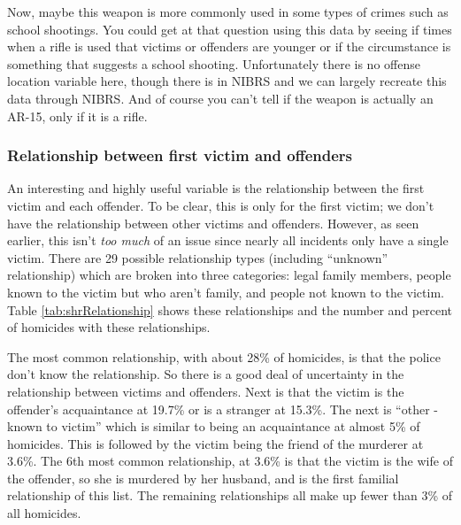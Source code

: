 \documentclass[
]{krantz}
\begin{document}
Now, maybe this weapon is more commonly used in some types
of crimes such as school shootings. You could get at that
question using this data by seeing if times when a rifle is
used that victims or offenders are younger or if the
circumstance is something that suggests a school shooting.
Unfortunately there is no offense location variable here,
though there is in NIBRS and we can largely recreate this
data through NIBRS. And of course you can't tell if the
weapon is actually an AR-15, only if it is a rifle.

\subsubsection{Relationship between first victim and
offenders}\label{relationship-between-first-victim-and-offenders}

An interesting and highly useful variable is the
relationship between the first victim and each offender. To
be clear, this is only for the first victim; we don't have
the relationship between other victims and offenders.
However, as seen earlier, this isn't \emph{too much} of an
issue since nearly all incidents only have a single victim.
There are 29 possible relationship types (including
``unknown'' relationship) which are broken into three
categories: legal family members, people known to the victim
but who aren't family, and people not known to the victim.
Table \ref{tab:shrRelationship} shows these relationships
and the number and percent of homicides with these
relationships.

The most common relationship, with about 28\% of homicides,
is that the police don't know the relationship. So there is
a good deal of uncertainty in the relationship between
victims and offenders. Next is that the victim is the
offender's acquaintance at 19.7\% or is a stranger at
15.3\%. The next is ``other - known to victim'' which is
similar to being an acquaintance at almost 5\% of homicides.
This is followed by the victim being the friend of the
murderer at 3.6\%. The 6th most common relationship, at
3.6\% is that the victim is the wife of the offender, so she
is murdered by her husband, and is the first familial
relationship of this list. The remaining relationships all
make up fewer than 3\% of all homicides.
\end{document}
